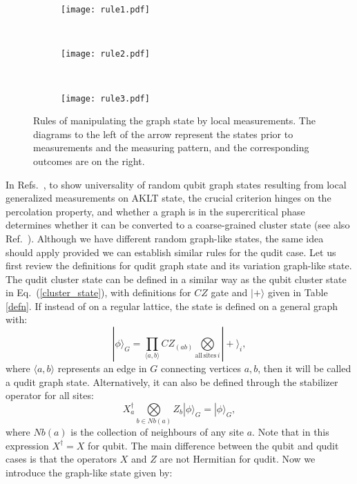 \documentclass[aps,amsfonts,pra,twocolumn,showpacs]{revtex4-1}
\def\ket#1{\vert#1\rangle}
\newcommand{\be}{\begin{equation}}
\newcommand{\ee}{\end{equation}}
\begin{document}
	\begin{figure}[h]
		\centering
		\begin{subfigure}{0.45\textwidth}
			\centering
			\texttt{[image: rule1.pdf]}
			\caption{} \label{fig:rule1}
		\end{subfigure} \\
		\vspace{10mm}
		\begin{subfigure}{0.45\textwidth}
			\centering
			\texttt{[image: rule2.pdf]}
			\caption{} \label{fig:rule2}
		\end{subfigure} \\
		\vspace{10mm}
		\begin{subfigure}{0.45\textwidth}
			\centering
			\texttt{[image: rule3.pdf]}
			\caption{} \label{fig:rule3}
		\end{subfigure}
		\caption{Rules of manipulating the graph state by local measurements. The diagrams to the left of the arrow represent the states prior to measurements and the measuring pattern, and the corresponding outcomes are on the right.} \label{graph}
	\end{figure}
	In Refs.~\cite{Wei2011, Wei2012}, to show universality of random qubit graph states resulting from local generalized measurements on AKLT state, the crucial criterion hinges on the percolation property, and whether a graph is in the supercritical phase determines whether it can be converted to a coarse-grained cluster state (see also Ref.~\cite{Browne2008}). Although we have different random graph-like states, the same idea should apply provided we can establish similar rules for the qudit case. Let us first review the definitions for qudit graph state and its variation graph-like state. The qudit cluster state can be defined in a similar way as the qubit cluster state in Eq.~(\ref{cluster_state}), with definitions for $CZ$ gate and $\ket +$ given in Table \ref{defn}. If instead of on a regular lattice, the state is defined on a general graph with:
		\be
		|\phi\rangle_G = \prod_{\langle a, b\rangle} CZ_{(ab)} \underset{\mathrm{all \, sites} \, i}{\bigotimes} |+\rangle_i,
		\ee
	where $\langle a, b\rangle$ represents an edge in $G$ connecting vertices $a, b$, then it will be called a qudit graph state. Alternatively, it can also be defined through the stabilizer operator for all sites:
		\be
		X^\dagger_a \underset{b\in Nb(a)}{\bigotimes} Z_b |\phi\rangle_G = |\phi\rangle_G,
		\ee
	where $Nb(a)$ is the collection of neighbours of any site $a$. Note that in this expression $X^\dagger=X$ for qubit. The main difference between the qubit and qudit cases is that the operators $X$ and $Z$ are not Hermitian for qudit. Now we introduce the graph-like state given by:
\end{document}
